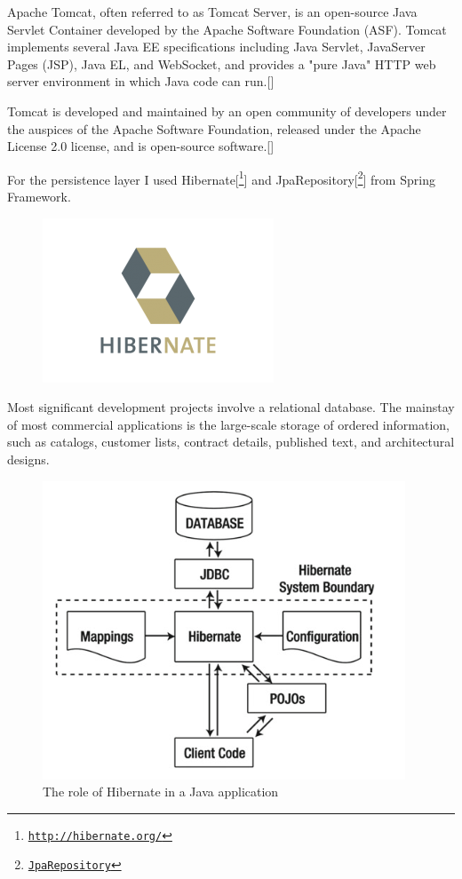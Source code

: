 Apache Tomcat, often referred to as Tomcat Server, is an open-source Java Servlet Container developed by the Apache Software Foundation (ASF). Tomcat implements several Java EE specifications including Java Servlet, JavaServer Pages (JSP), Java EL, and WebSocket, and provides a "pure Java" HTTP web server environment in which Java code can run.[\cite{18}]
\newline

Tomcat is developed and maintained by an open community of developers under the auspices of the Apache Software Foundation, released under the Apache License 2.0 license, and is open-source software.[\cite{18}]
\newline

For the persistence layer I used Hibernate[\footnote{\href{http://hibernate.org/}{\texttt{http://hibernate.org/}}}] and JpaRepository[\footnote{\href{http://docs.spring.io/spring-data/jpa/docs/current/api/org/springframework/data/jpa/repository/JpaRepository.html}{\texttt{JpaRepository}}}] from Spring Framework.
\newline
\begin{figure}[h]
	\centering
	\includegraphics[width=.5\linewidth]{images/Hibernate}
	\label{fig:hibernate-logo}
\end{figure}
Most significant development projects involve a relational database. The mainstay of most commercial applications is the large-scale storage of ordered information, such as catalogs, customer lists, contract details, published text, and architectural designs.  
\newline
\begin{figure}[h]
	\centering
	\includegraphics[width=.5\linewidth]{images/hibernateinjava}
	\caption{The role of Hibernate in a Java  application}
	\label{fig:roleofhibernate}
\end{figure}

